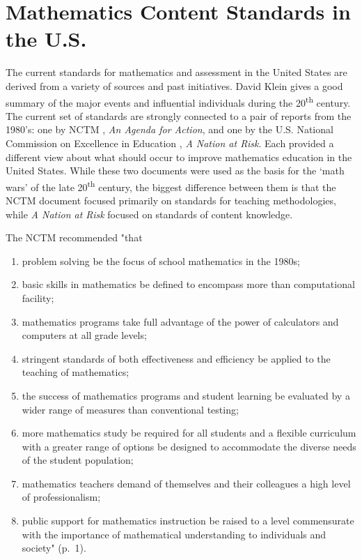\documentclass[
]{book}
\theoremstyle{definition}
\theoremstyle{definition}
\theoremstyle{definition}
\theoremstyle{remark}
\begin{document}
\hypertarget{mathematics-content-standards-in-the-u.s.}{%
\section{Mathematics Content Standards in the U.S.}\label{mathematics-content-standards-in-the-u.s.}}

The current standards for mathematics and assessment in the United States are derived from a variety of sources and past initiatives. David Klein \citeyearpar{Klein2003} gives a good summary of the major events and influential individuals during the 20\textsuperscript{th} century. The current set of standards are strongly connected to a pair of reports from the 1980's: one by NCTM \citeyearpar{NCTM1980}, \emph{An Agenda for Action}, and one by the U.S. National Commission on Excellence in Education \citeyearpar{NCEE1983}, \emph{A Nation at Risk}. Each provided a different view about what should occur to improve mathematics education in the United States. While these two documents were used as the basis for the `math wars' of the late 20\textsuperscript{th} century, the biggest difference between them is that the NCTM document focused primarily on standards for teaching methodologies, while \emph{A Nation at Risk} focused on standards of content knowledge.

The NCTM \citeyearpar{NCTM1980} recommended "that

\begin{enumerate}
\def\labelenumi{\arabic{enumi}.}
\item
  problem solving be the focus of school mathematics in the 1980s;
\item
  basic skills in mathematics be defined to encompass more than computational facility;
\item
  mathematics programs take full advantage of the power of calculators and computers at all grade levels;
\item
  stringent standards of both effectiveness and efficiency be applied to the teaching of mathematics;
\item
  the success of mathematics programs and student learning be evaluated by a wider range of measures than conventional testing;
\item
  more mathematics study be required for all students and a flexible curriculum with a greater range of options be designed to accommodate the diverse needs of the student population;
\item
  mathematics teachers demand of themselves and their colleagues a high level of professionalism;
\item
  public support for mathematics instruction be raised to a level commensurate with the importance of mathematical understanding to individuals and society" (p.~1).
\end{enumerate}
\end{document}
